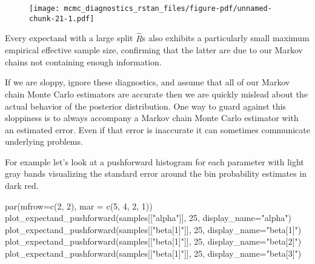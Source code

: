 \documentclass[
  letterpaper,
  DIV=11,
  numbers=noendperiod]{scrartcl}
\newenvironment{Shaded}{\begin{snugshade}}{\end{snugshade}}
\newcommand{\AttributeTok}[1]{\textcolor[rgb]{0.40,0.45,0.13}{#1}}
\newcommand{\DecValTok}[1]{\textcolor[rgb]{0.68,0.00,0.00}{#1}}
\newcommand{\FunctionTok}[1]{\textcolor[rgb]{0.28,0.35,0.67}{#1}}
\newcommand{\NormalTok}[1]{\textcolor[rgb]{0.00,0.23,0.31}{#1}}
\newcommand{\StringTok}[1]{\textcolor[rgb]{0.13,0.47,0.30}{#1}}
\begin{document}
\begin{figure}[H]

{\centering \texttt{[image: mcmc\_diagnostics\_rstan\_files/figure-pdf/unnamed-chunk-21-1.pdf]}

}

\end{figure}

Every expectand with a large split \(\hat{R}\)s also exhibits a
particularly small maximum empirical effective sample size, confirming
that the latter are due to our Markov chains not containing enough
information.

If we are sloppy, ignore these diagnostics, and assume that all of our
Markov chain Monte Carlo estimators are accurate then we are quickly
mislead about the actual behavior of the posterior distribution. One way
to guard against this sloppiness is to always accompany a Markov chain
Monte Carlo estimator with an estimated error. Even if that error is
inaccurate it can sometimes communicate underlying problems.

For example let's look at a pushforward histogram for each parameter
with light gray bands visualizing the standard error around the bin
probability estimates in dark red.

\begin{Shaded}
\begin{Highlighting}[]
\FunctionTok{par}\NormalTok{(}\AttributeTok{mfrow=}\FunctionTok{c}\NormalTok{(}\DecValTok{2}\NormalTok{, }\DecValTok{2}\NormalTok{), }\AttributeTok{mar =} \FunctionTok{c}\NormalTok{(}\DecValTok{5}\NormalTok{, }\DecValTok{4}\NormalTok{, }\DecValTok{2}\NormalTok{, }\DecValTok{1}\NormalTok{))}
\FunctionTok{plot\_expectand\_pushforward}\NormalTok{(samples[[}\StringTok{"alpha"}\NormalTok{]], }\DecValTok{25}\NormalTok{, }\AttributeTok{display\_name=}\StringTok{"alpha"}\NormalTok{)}
\FunctionTok{plot\_expectand\_pushforward}\NormalTok{(samples[[}\StringTok{"beta[1]"}\NormalTok{]], }\DecValTok{25}\NormalTok{, }\AttributeTok{display\_name=}\StringTok{"beta[1]"}\NormalTok{)}
\FunctionTok{plot\_expectand\_pushforward}\NormalTok{(samples[[}\StringTok{"beta[1]"}\NormalTok{]], }\DecValTok{25}\NormalTok{, }\AttributeTok{display\_name=}\StringTok{"beta[2]"}\NormalTok{)}
\FunctionTok{plot\_expectand\_pushforward}\NormalTok{(samples[[}\StringTok{"beta[1]"}\NormalTok{]], }\DecValTok{25}\NormalTok{, }\AttributeTok{display\_name=}\StringTok{"beta[3]"}\NormalTok{)}
\end{Highlighting}
\end{Shaded}
\end{document}
